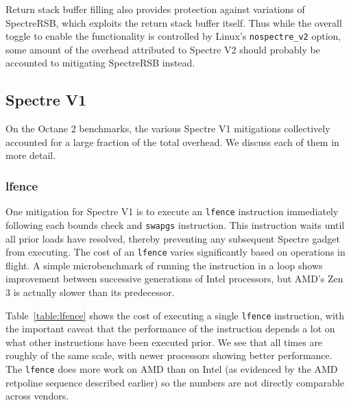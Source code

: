Return stack buffer filling also provides protection against variations of
SpectreRSB, which exploits the return stack buffer itself.
Thus while the overall toggle to enable the functionality is controlled by Linux's \texttt{nospectre\_v2} option, some amount of the overhead attributed to Spectre V2 should probably be accounted to mitigating SpectreRSB instead.

\subsection{Spectre V1}

On the Octane 2 benchmarks, the various Spectre V1 mitigations collectively accounted for a large fraction of the total overhead.
We discuss each of them in more detail.

\subsubsection{lfence}

One mitigation for Spectre V1 is to execute an \texttt{lfence} instruction immediately following each bounds check and \texttt{swapgs} instruction.
This instruction waits until all prior loads have resolved, thereby preventing any subsequent Spectre gadget from executing.
The cost of an \texttt{lfence} varies significantly based on operations in flight.
A simple microbenchmark of running the instruction in a loop shows improvement between successive generations of Intel processors, but AMD's Zen 3 is actually slower than its predecessor.

Table~\ref{table:lfence} shows the cost of executing a single \texttt{lfence} instruction, with the important caveat that the performance of the instruction depends a lot on what other instructions have been executed prior.
We see that all times are roughly of the same scale, with newer processors showing better performance.
The \texttt{lfence} does more work on AMD than on Intel (as evidenced by the AMD retpoline sequence described earlier) so the numbers are not directly comparable across vendors.


